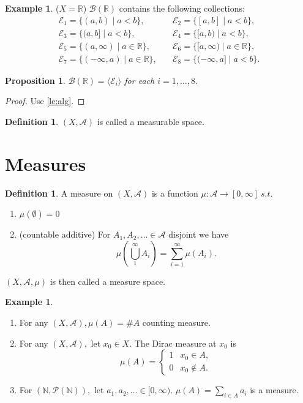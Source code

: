 \documentclass{report}
\newcommand{\R}{\mathbb{R}}
\newcommand{\N}{\mathbb{N}}
\newcommand{\st}{\ s.t.\ }
\newtheorem{proposition}[theorem]{Proposition}
\theoremstyle{definition}
\newtheorem{definition}[theorem]{Definition}
\newtheorem{example}[theorem]{Example}
\theoremstyle{remark}
\begin{document}
\begin{example}($X = \R$)
$\mathcal{B}(\R)$ contains the following collections:
\begin{align*}
	\mathcal{E}_1 = \{(a, b) \mid a < b\},& \quad \mathcal{E}_2 = \{[a, b] \mid a < b\},\\
	\mathcal{E}_3 = \{(a, b] \mid a < b\},& \quad \mathcal{E}_4 = \{[a, b) \mid a < b\},\\
	\mathcal{E}_5 = \{(a, \infty) \mid a \in \R\},& \quad \mathcal{E}_6 = \{[a, \infty) \mid a \in \R \},\\
	\mathcal{E}_7 = \{(-\infty, a) \mid a \in \R\},& \quad \mathcal{E}_8 = \{(-\infty, a] \mid a < b\}.
\end{align*}

\end{example}

\begin{proposition}
$\mathcal{B}(\R) = \langle\mathcal{E}_i\rangle$ for each $i = 1, \ldots, 8$. 
\end{proposition}
\begin{proof}
Use \ref{le:alg}.
\end{proof}

\begin{definition}
$(X, \mathcal{A})$ is called a measurable space.
\end{definition}


\section{Measures}
\begin{definition}
A measure on $(X, \mathcal{A})$ is a function $\mu: \mathcal{A} \to [0, \infty] \st$
\begin{enumerate}
\item $\mu(\emptyset) = 0$
\item (countable additive) For $A_1, A_2, \ldots \in \mathcal{A}$ disjoint we have
\[
\mu\left(\bigcup_1^\infty A_i \right) = \sum_{i=1}^\infty \mu(A_i).
\]
\end{enumerate}
$(X,  \mathcal{A}, \mu)$ is then called a measure space.
\end{definition}

\begin{example}
\begin{enumerate}
\item For any $(X, \mathcal{A}), \mu(A) = \#A$ counting measure.
\item For any $(X, \mathcal{A}),$ let $x_0 \in X.$ The Dirac measure at $x_0$ is
\[
\mu(A) = \begin{cases}
1 & x_0 \in A, \\
0 & x_0 \notin A.
\end{cases}
\]
\item For $(\N, \mathcal{P}(\N)),$ let $a_1, a_2, \ldots \in [0, \infty).$ $\mu(A) = \sum_{i \in A} a_i$ is a measure.
\end{enumerate}
\end{example}
\end{document}
